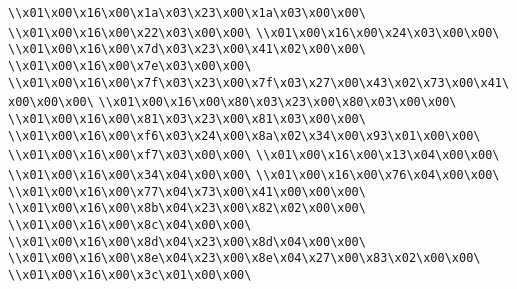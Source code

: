\verb|\\x01\x00\x16\x00\x1a\x03\x23\x00\x1a\x03\x00\x00\|\newline
\verb|\\x01\x00\x16\x00\x22\x03\x00\x00\|\newline
\verb|\\x01\x00\x16\x00\x24\x03\x00\x00\|\newline
\verb|\\x01\x00\x16\x00\x7d\x03\x23\x00\x41\x02\x00\x00\|\newline
\verb|\\x01\x00\x16\x00\x7e\x03\x00\x00\|\newline
\verb|\\x01\x00\x16\x00\x7f\x03\x23\x00\x7f\x03\x27\x00\x43\x02\x73\x00\x41\x00\x00\x00\|\newline
\verb|\\x01\x00\x16\x00\x80\x03\x23\x00\x80\x03\x00\x00\|\newline
\verb|\\x01\x00\x16\x00\x81\x03\x23\x00\x81\x03\x00\x00\|\newline
\verb|\\x01\x00\x16\x00\xf6\x03\x24\x00\x8a\x02\x34\x00\x93\x01\x00\x00\|\newline
\verb|\\x01\x00\x16\x00\xf7\x03\x00\x00\|\newline
\verb|\\x01\x00\x16\x00\x13\x04\x00\x00\|\newline
\verb|\\x01\x00\x16\x00\x34\x04\x00\x00\|\newline
\verb|\\x01\x00\x16\x00\x76\x04\x00\x00\|\newline
\verb|\\x01\x00\x16\x00\x77\x04\x73\x00\x41\x00\x00\x00\|\newline
\verb|\\x01\x00\x16\x00\x8b\x04\x23\x00\x82\x02\x00\x00\|\newline
\verb|\\x01\x00\x16\x00\x8c\x04\x00\x00\|\newline
\verb|\\x01\x00\x16\x00\x8d\x04\x23\x00\x8d\x04\x00\x00\|\newline
\verb|\\x01\x00\x16\x00\x8e\x04\x23\x00\x8e\x04\x27\x00\x83\x02\x00\x00\|\newline
\verb|\\x01\x00\x16\x00\x3c\x01\x00\x00\|\newline
